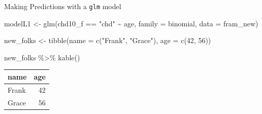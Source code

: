 \documentclass[
  ignorenonframetext,
]{beamer}
\newenvironment{Shaded}{\begin{snugshade}}{\end{snugshade}}
\newcommand{\AttributeTok}[1]{\textcolor[rgb]{0.77,0.63,0.00}{#1}}
\newcommand{\DecValTok}[1]{\textcolor[rgb]{0.00,0.00,0.81}{#1}}
\newcommand{\FunctionTok}[1]{\textcolor[rgb]{0.00,0.00,0.00}{#1}}
\newcommand{\NormalTok}[1]{#1}
\newcommand{\OtherTok}[1]{\textcolor[rgb]{0.56,0.35,0.01}{#1}}
\newcommand{\SpecialCharTok}[1]{\textcolor[rgb]{0.00,0.00,0.00}{#1}}
\newcommand{\StringTok}[1]{\textcolor[rgb]{0.31,0.60,0.02}{#1}}
\begin{document}
\begin{frame}[fragile]{Making Predictions with a \texttt{glm} model}
\protect\hypertarget{making-predictions-with-a-glm-model}{}
\begin{Shaded}
\begin{Highlighting}[]
\NormalTok{modelL1 }\OtherTok{\textless{}{-}} \FunctionTok{glm}\NormalTok{(chd10\_f }\SpecialCharTok{==} \StringTok{"chd"} \SpecialCharTok{\textasciitilde{}}\NormalTok{ age, }
               \AttributeTok{family =}\NormalTok{ binomial, }\AttributeTok{data =}\NormalTok{ fram\_new)}

\NormalTok{new\_folks }\OtherTok{\textless{}{-}} \FunctionTok{tibble}\NormalTok{(}\AttributeTok{name =} \FunctionTok{c}\NormalTok{(}\StringTok{"Frank"}\NormalTok{, }\StringTok{"Grace"}\NormalTok{),}
                    \AttributeTok{age =} \FunctionTok{c}\NormalTok{(}\DecValTok{42}\NormalTok{, }\DecValTok{56}\NormalTok{))}

\NormalTok{new\_folks }\SpecialCharTok{\%\textgreater{}\%} \FunctionTok{kable}\NormalTok{()}
\end{Highlighting}
\end{Shaded}

\begin{longtable}[]{@{}lr@{}}
\toprule
name & age \\
\midrule
\endhead
Frank & 42 \\
Grace & 56 \\
\bottomrule
\end{longtable}
\end{frame}
\end{document}
